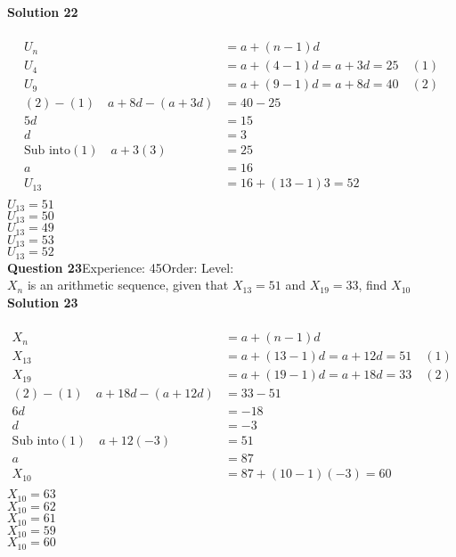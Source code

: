 \documentclass{article}
\begin{document}
\noindent\textbf{Solution 22}\\[2pt]
\\[-10pt]\begin{align*}
U_n&=a+(n-1)d\\[2pt]
U_4&=a+(4-1)d=a+3d=25\quad (1)\\[2pt]
U_9&=a+(9-1)d=a+8d=40\quad (2)\\[2pt]
(2)-(1)\quad a+8d-(a+3d)&=40-25\\[2pt]
5d&=15\\[2pt]
d&=3\\[12pt]
\text{Sub into} (1) \quad a+3(3)&=25\\[2pt]
a&=16\\[12pt]
U_{13}&=16+(13-1)3=52\\[-40pt]
\end{align*}
$U_{13}=51$\\
$U_{13}=50$\\
$U_{13}=49$\\
$U_{13}=53$\\
$U_{13}=52$\\
\noindent\textbf{Question 23}\hspace{20pt}Experience: 45\hspace{20pt}Order: \hspace{20pt}Level: \\[2pt]
$X_n$ is an arithmetic sequence, given that $X_{13}=51$ and $X_{19}=33$, find $X_{10}$\\[4pt]
\noindent\textbf{Solution 23}\\[2pt]
\\[-10pt]\begin{align*}
X_n&=a+(n-1)d\\[2pt]
X_{13}&=a+(13-1)d=a+12d=51\quad (1)\\[2pt]
X_{19}&=a+(19-1)d=a+18d=33\quad (2)\\[2pt]
(2)-(1)\quad a+18d-(a+12d)&=33-51\\[2pt]
6d&=-18\\[2pt]
d&=-3\\[12pt]
\text{Sub into} (1) \quad a+12(-3)&=51\\[2pt]
a&=87\\[12pt]
X_{10}&=87+(10-1)(-3)=60\\[-40pt]
\end{align*}
$X_{10}=63$\\
$X_{10}=62$\\
$X_{10}=61$\\
$X_{10}=59$\\
$X_{10}=60$\\
\end{document}

